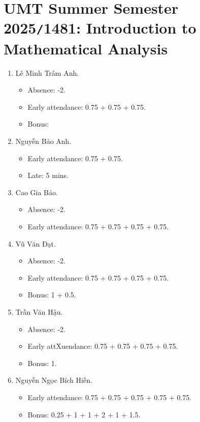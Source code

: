 \documentclass{article}
\begin{document}

\section{UMT Summer Semester 2025{\tt/}1481: Introduction to Mathematical Analysis}

\begin{enumerate}
	\item {\sc Lê Minh Trâm Anh.}
	\begin{itemize}
		\item Absence: -2.
		\item Early attendance: 0.75 + 0.75 + 0.75.
		\item Bonus: 
	\end{itemize}
	\item {\sc Nguyễn Bảo Anh.}
	\begin{itemize}
		\item Early attendance: 0.75  + 0.75.
		\item Late: 5 mins.
	\end{itemize}
	\item {\sc Cao Gia Bảo.}
	\begin{itemize}
		\item Absence: -2.
		\item Early attendance: 0.75 + 0.75 + 0.75 + 0.75.
	\end{itemize}
	\item {\sc Vũ Văn Đạt.}
	\begin{itemize}
		\item Absence: -2.
		\item Early attendance: 0.75 + 0.75 + 0.75 + 0.75.
		\item Bonus: 1 + 0.5.
	\end{itemize}
	\item {\sc Trần Văn Hậu.}
	\begin{itemize}
		\item Absence: -2.
		\item Early attXuendance: 0.75 + 0.75 + 0.75 + 0.75.
		\item Bonus: 1.
	\end{itemize}
	\item {\sc Nguyễn Ngọc Bích Hiền.}
	\begin{itemize}
		\item Early attendance: 0.75 + 0.75 + 0.75 + 0.75 + 0.75.
		\item Bonus: 0.25 + 1 + 1 + 2 + 1 + 1.5.

\end{itemize}
\end{enumerate}
\end{document}
